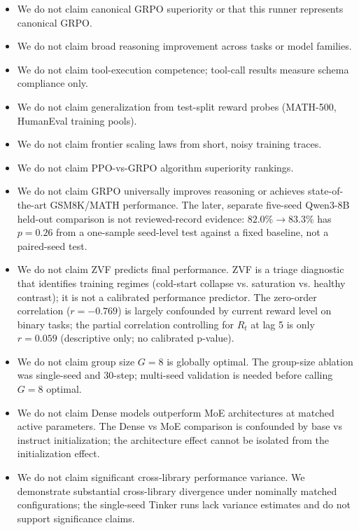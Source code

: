 \begin{itemize}
    \item We do not claim canonical GRPO superiority or that this runner represents canonical GRPO.
    \item We do not claim broad reasoning improvement across tasks or model families.
    \item We do not claim tool-execution competence; tool-call results measure schema compliance only.
    \item We do not claim generalization from test-split reward probes (MATH-500, HumanEval training pools).
    \item We do not claim frontier scaling laws from short, noisy training traces.
    \item We do not claim PPO-vs-GRPO algorithm superiority rankings.
    \item We do not claim GRPO universally improves reasoning or achieves state-of-the-art GSM8K/MATH performance. The later, separate five-seed Qwen3-8B held-out comparison is not reviewed-record evidence: $82.0\% \to 83.3\%$ has $p=0.26$ from a one-sample seed-level test against a fixed baseline, not a paired-seed test.
    \item We do not claim ZVF predicts final performance. ZVF is a triage diagnostic that identifies training regimes (cold-start collapse vs. saturation vs. healthy contrast); it is not a calibrated performance predictor. The zero-order correlation ($r = -0.769$) is largely confounded by current reward level on binary tasks; the partial correlation controlling for $R_t$ at lag 5 is only $r = 0.059$ (descriptive only; no calibrated p-value).
    \item We do not claim group size $G=8$ is globally optimal. The group-size ablation was single-seed and 30-step; multi-seed validation is needed before calling $G=8$ optimal.
    \item We do not claim Dense models outperform MoE architectures at matched active parameters. The Dense vs MoE comparison is confounded by base vs instruct initialization; the architecture effect cannot be isolated from the initialization effect.
    \item We do not claim significant cross-library performance variance. We demonstrate substantial cross-library divergence under nominally matched configurations; the single-seed Tinker runs lack variance estimates and do not support significance claims.
\end{itemize}

